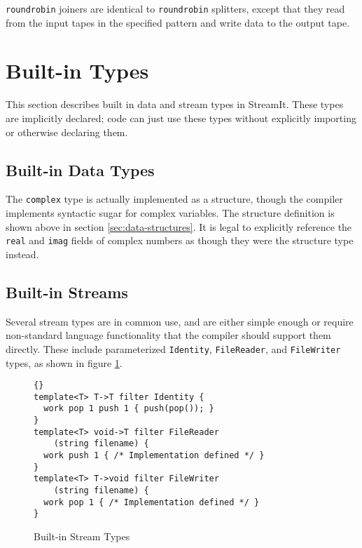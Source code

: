 \documentclass[11pt]{article}
\begin{document}
\lstinline|roundrobin| joiners are identical to \lstinline|roundrobin|
splitters, except that they read from the input tapes in the specified
pattern and write data to the output tape.


\section{Built-in Types}

This section describes built in data and stream types in StreamIt.
These types are implicitly declared; code can just use these types
without explicitly importing or otherwise declaring them.

\subsection{Built-in Data Types}

The \lstinline|complex| type is actually implemented as a structure,
though the compiler implements syntactic sugar for complex variables.
The structure definition is shown above in section
\ref{sec:data-structures}.
It is legal to explicitly reference the \lstinline|real| and
\lstinline|imag| fields of complex numbers as though they were the
structure type instead.

\subsection{Built-in Streams}

Several stream types are in common use, and are either simple enough
or require non-standard language functionality that the compiler
should support them directly.  These include parameterized
\lstinline|Identity|, \lstinline|FileReader|, and \lstinline|FileWriter| types, as
shown in figure \ref{fig:built-in-streams}.

\begin{figure}[htbp]
    \begin{lstlisting}{}
template<T> T->T filter Identity {
  work pop 1 push 1 { push(pop()); }
}
template<T> void->T filter FileReader
    (string filename) {
  work push 1 { /* Implementation defined */ }
}
template<T> T->void filter FileWriter
    (string filename) {
  work pop 1 { /* Implementation defined */ }
}
\end{lstlisting}
    \caption{Built-in Stream Types}
    \label{fig:built-in-streams}
\end{figure}


\end{document}
